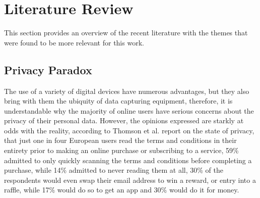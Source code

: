 \documentclass[conference]{IEEEtran}
\begin{document}
\section{Literature Review}

\par
This section provides an overview of the recent literature with the themes
that were found to be more relevant for this work.

\subsection{Privacy Paradox}

The use of a variety of digital devices have numerous advantages, but they
also bring with them the ubiquity of data capturing equipment, therefore,
it is understandable why the majority of online users have serious concerns
about the privacy of their personal data. However, the opinions expressed
are starkly at odds with the reality, according to Thomson et al. \cite{DarrenState}
report on the state of privacy, that just one in four European users read
the terms and conditions in their entirety prior to making an online purchase
or subscribing to a service, 59\% admitted to only quickly scanning the terms
and conditions before completing a purchase, while 14\% admitted to never
reading them at all, 30\% of the respondents would even swap their email
address to win a reward, or entry into a raffle, while 17\% would do so to
get an app and 30\% would do it for money.
\end{document}
